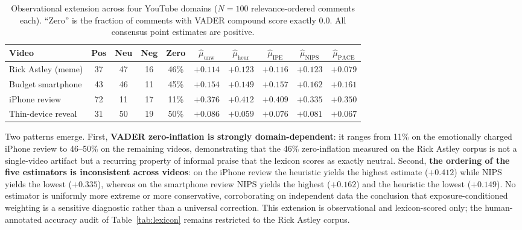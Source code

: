 \documentclass[journal]{IEEEtran}
\begin{document}
\begin{table}[t]
\caption{Observational extension across four YouTube domains ($N = 100$ relevance-ordered comments each). ``Zero'' is the fraction of comments with VADER compound score exactly $0.0$. All consensus point estimates are positive.}
\label{tab:multivideo}
\centering
\footnotesize
\setlength{\tabcolsep}{4pt}
\begin{tabular}{lccccccccc}
\toprule
\textbf{Video} & \textbf{Pos} & \textbf{Neu} & \textbf{Neg} & \textbf{Zero} & $\hat{\mu}_{\text{unw}}$ & $\hat{\mu}_{\text{heur}}$ & $\hat{\mu}_{\text{IPE}}$ & $\hat{\mu}_{\text{NIPS}}$ & $\hat{\mu}_{\text{PACE}}$ \\
\midrule
Rick Astley (meme) & 37 & 47 & 16 & 46\% & $+0.114$ & $+0.123$ & $+0.116$ & $+0.123$ & $+0.079$ \\
Budget smartphone  & 43 & 46 & 11 & 45\% & $+0.154$ & $+0.149$ & $+0.157$ & $+0.162$ & $+0.161$ \\
iPhone review      & 72 & 11 & 17 & 11\% & $+0.376$ & $+0.412$ & $+0.409$ & $+0.335$ & $+0.350$ \\
Thin-device reveal & 31 & 50 & 19 & 50\% & $+0.086$ & $+0.059$ & $+0.076$ & $+0.081$ & $+0.067$ \\
\bottomrule
\end{tabular}
\end{table}

Two patterns emerge. First, \textbf{VADER zero-inflation is strongly domain-dependent}: it ranges from 11\% on the emotionally charged iPhone review to 46--50\% on the remaining videos, demonstrating that the 46\% zero-inflation measured on the Rick Astley corpus is not a single-video artifact but a recurring property of informal praise that the lexicon scores as exactly neutral. Second, \textbf{the ordering of the five estimators is inconsistent across videos}: on the iPhone review the heuristic yields the highest estimate ($+0.412$) while NIPS yields the lowest ($+0.335$), whereas on the smartphone review NIPS yields the highest ($+0.162$) and the heuristic the lowest ($+0.149$). No estimator is uniformly more extreme or more conservative, corroborating on independent data the conclusion that exposure-conditioned weighting is a sensitive diagnostic rather than a universal correction. This extension is observational and lexicon-scored only; the human-annotated accuracy audit of Table~\ref{tab:lexicon} remains restricted to the Rick Astley corpus.
\end{document}

